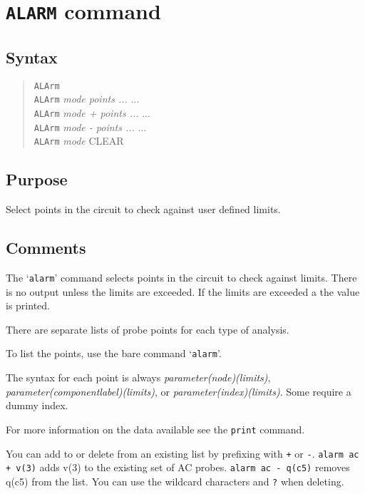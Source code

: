 \section{{\tt ALARM} command}
\subsection{Syntax}
\begin{verse}
{\tt ALArm}\\
{\tt ALArm} {\it mode points ...} ...\\
{\tt ALArm} {\it mode + points ...} ...\\
{\tt ALArm} {\it mode - points ...} ...\\
{\tt ALArm} {\it mode} CLEAR
\end{verse}
\subsection{Purpose}

Select points in the circuit to check against user defined limits.
\subsection{Comments}

The `{\tt alarm}' command selects points in the circuit to check
against limits.  There is no output unless the limits are exceeded.
If the limits are exceeded a the value is printed.

There are separate lists of probe points for each type of analysis.

To list the points, use the bare command `{\tt alarm}'.

The syntax for each point is always {\it parameter(node)(limits)},
{\it parameter(componentlabel)(limits)}, or {\it parameter(index)(limits)}.
Some require a dummy index.

For more information on the data available see the {\tt print}
command.

You can add to or delete from an existing list by prefixing with
{\tt +} or {\tt -}.  {\tt alarm ac + v(3)} adds v(3) to the existing
set of AC probes.  {\tt alarm ac - q(c5)} removes q(c5) from the
list.  You can use the wildcard characters {\tt *} and {\tt ?} when
deleting.
